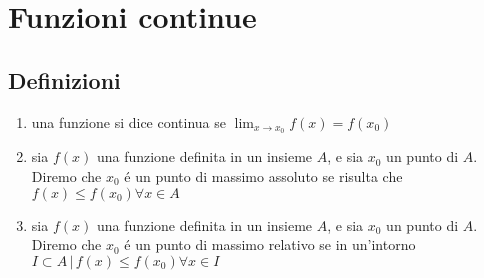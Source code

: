 \documentclass{exam}
\begin{document}
\section{Funzioni continue}
  \subsection{Definizioni}
    \begin{enumerate}
      \item
        una funzione si dice continua se \(\displaystyle \lim_{x\to x_{0}}f(x)=f(x_{0})\)
      \item
        sia $f(x)$ una funzione definita in un insieme $A$, e sia $x_{0}$ un punto di $A$. Diremo che $x_{0}$ \'e un punto di massimo assoluto se risulta che $f(x)\le f(x_{0}) \forall x\in A$
      \item
        sia $f(x)$ una funzione definita in un insieme $A$, e sia $x_{0}$ un punto di $A$. Diremo che $x_{0}$ \'e un punto di massimo relativo se in un'intorno $I\subset A\,|\,f(x)\le f(x_{0}) \forall x\in I$
    \end{enumerate}
\end{document}
